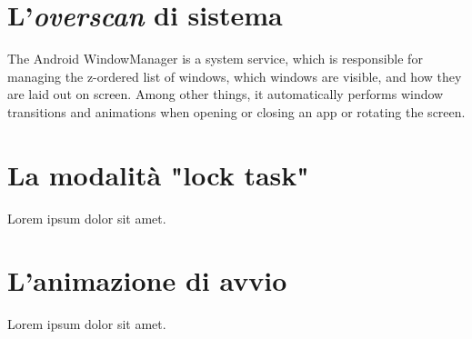 \section{L'\emph{overscan} di sistema}
\label{sec:kiosk_overscan}

The Android WindowManager is a system service, which is responsible for managing the z-ordered list of windows, which windows are visible, and how they are laid out on screen. Among other things, it automatically performs window transitions and animations when opening or closing an app or rotating the screen.

\section{La modalità "lock task"}
\label{sec:kiosk_locktask}

Lorem ipsum dolor sit amet.

\section{L'animazione di avvio}
\label{sec:kiosk_bootanimation}

Lorem ipsum dolor sit amet.


